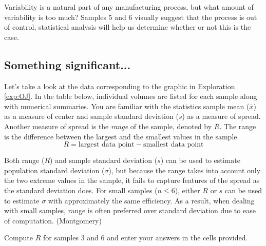 \documentclass{ximera}
\begin{document}
Variability is a natural part of any manufacturing process, but what amount of variability is too much?  Samples 5 and 6 visually suggest that the process is out of control, statistical analysis will help us determine whether or not this is the case. 






\subsection*{Something significant...}
Let's take a look at the data corresponding to the graphic in Exploration \ref{exp:OJ}.  In the table below, individual volumes are listed for each sample along with numerical summaries.  You are familiar with the statistics sample mean ($\bar{x}$) as a measure of center and sample standard deviation ($s$) as a measure of spread.  Another measure of spread is the  \emph{range} of the sample, denoted by $R$.  The range is the difference between the largest and the smallest values in the sample.  
$$R=\text{largest data point}-\text{smallest data point}$$

Both range ($R$) and sample standard deviation ($s$) can be used to estimate population standard deviation ($\sigma$), but because the range takes into account only the two extreme values in the sample, it fails to capture features of the spread as the standard deviation does.  For small samples ($n\leq 6$), either $R$ or $s$ can be used to estimate $\sigma$ with approximately the same efficiency.  As a result, when dealing with small samples, range is often preferred over standard deviation due to ease of computation. (Montgomery)

Compute $R$ for samples 3 and 6 and enter your answers in the cells provided.
\end{document}
